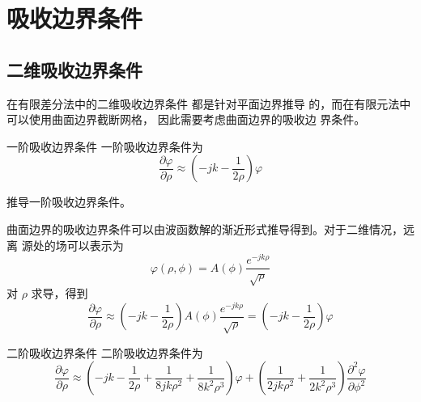 \section{吸收边界条件}

\subsection{二维吸收边界条件}

\par 在有限差分法中的二维吸收边界条件
都是针对平面边界推导
的，而在有限元法中可以使用曲面边界截断网格，
因此需要考虑曲面边界的吸收边
界条件。

\begin{theorem}{一阶吸收边界条件}
    一阶吸收边界条件为
    \begin{equation}
        \frac{\partial \varphi}{\partial \rho}
        \approx
        \left(
            -jk-\frac{1}{2\rho}
        \right)\varphi
    \end{equation}
\end{theorem}

\begin{exercise}
    推导一阶吸收边界条件。
\end{exercise}

\begin{solution}
    曲面边界的吸收边界条件可以由波函数解的渐近形式推导得到。对于二维情况，远离
    源处的场可以表示为
    \begin{equation*}
        \varphi(\rho,\phi)=A(\phi)\frac{e^{-jk\rho}}{\sqrt{\rho}}
    \end{equation*}
    对 $\rho$ 求导，得到
    \begin{equation*}
        \frac{\partial \varphi}{\partial \rho}
        \approx
        \left(
            -jk-\frac{1}{2\rho}
        \right)A(\phi)\frac{e^{-jk\rho}}{\sqrt{\rho}}
        =
        \left(
            -jk-\frac{1}{2\rho}
        \right)\varphi
    \end{equation*}
\end{solution}

\begin{theorem}{二阶吸收边界条件}
    二阶吸收边界条件为
    \begin{equation}
        \frac{\partial \varphi}{\partial \rho}
        \approx
        \left(
            -jk-\frac{1}{2\rho}
            +\frac{1}{8jk\rho^2}
            +\frac{1}{8k^2\rho^3}
        \right)\varphi
        +\left(
            \frac{1}{2jk\rho^2}
            +\frac{1}{2k^2\rho^3}
        \right)\frac{\partial^2 \varphi}{\partial \phi^2}
    \end{equation}
\end{theorem}

